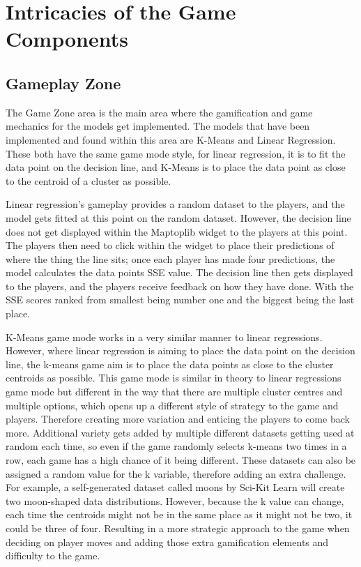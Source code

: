 	
	\section{Intricacies of the Game Components}
	\label{sec:gaem_intricacies}
	
	
	
	
	\subsection{Gameplay Zone}
		
		The Game Zone area is the main area where the gamification and game mechanics for the models get implemented.  The models that have been implemented and found within this area are K-Means and Linear Regression. These both have the same game mode style, for linear regression, it is to fit the data point on the decision line, and K-Means is to place the data point as close to the centroid of a cluster as possible. 
		
		Linear regression's gameplay provides a random dataset to the players, and the model gets fitted at this point on the random dataset. However, the decision line does not get displayed within the Maptoplib widget to the players at this point. The players then need to click within the widget to place their predictions of where the thing the line sits; once each player has made four predictions, the model calculates the data points SSE value. The decision line then gets displayed to the players, and the players receive feedback on how they have done. With the SSE scores ranked from smallest being number one and the biggest being the last place.
		
		K-Means game mode works in a very similar manner to linear regressions. However, where linear regression is aiming to place the data point on the decision line, the k-means game aim is to place the data points as close to the cluster centroids as possible. This game mode is similar in theory to linear regressions game mode but different in the way that there are multiple cluster centres and multiple options, which opens up a different style of strategy to the game and players. Therefore creating more variation and enticing the players to come back more. Additional variety gets added by multiple different datasets getting used at random each time, so even if the game randomly selects k-means two times in a row, each game has a high chance of it being different. These datasets can also be assigned a random value for the k variable, therefore adding an extra challenge. For example, a self-generated dataset called moons by Sci-Kit Learn will create two moon-shaped data distributions. However, because the k value can change, each time the centroids might not be in the same place as it might not be two, it could be three of four. Resulting in a more strategic approach to the game when deciding on player moves and adding those extra gamification elements and difficulty to the game.
		
